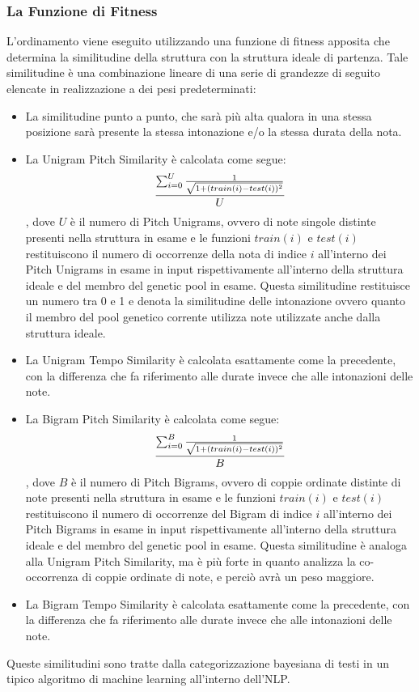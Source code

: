  \subsubsection{La Funzione di Fitness}
 L'ordinamento viene eseguito utilizzando una funzione di fitness apposita che determina la similitudine della struttura con la struttura ideale di partenza.
 Tale similitudine è una combinazione lineare di una serie di grandezze di seguito elencate in realizzazione a dei pesi predeterminati:
 \begin{itemize}
  \item La similitudine punto a punto, che sarà più alta qualora in una stessa posizione sarà presente la stessa intonazione e/o la stessa durata della nota.
  \item La Unigram Pitch Similarity è calcolata come segue:
  $${\sum_{i=0}^{U}{1 \over \sqrt{1 + (train(i)-test(i))^{2}}} \over U}$$, dove $U$ è il numero di Pitch Unigrams, ovvero di note singole distinte presenti nella struttura in esame e le funzioni $train(i)$ e $test(i)$ restituiscono il numero di occorrenze della nota di indice $i$ all'interno dei Pitch Unigrams in esame in input rispettivamente all'interno della struttura ideale e del membro del genetic pool in esame.
  Questa similitudine restituisce un numero tra 0 e 1 e denota la similitudine delle intonazione ovvero quanto il membro del pool genetico corrente utilizza note utilizzate anche dalla struttura ideale.
  \item La Unigram Tempo Similarity è calcolata esattamente come la precedente, con la differenza che fa riferimento alle durate invece che alle intonazioni delle note.
  \item La Bigram Pitch Similarity è calcolata come segue:
   $${\sum_{i=0}^{B}{1 \over \sqrt{1 + (train(i)-test(i))^{2}}} \over B}$$, dove $B$ è il numero di Pitch Bigrams, ovvero di coppie ordinate distinte di note presenti nella struttura in esame e le funzioni $train(i)$ e $test(i)$ restituiscono il numero di occorrenze del Bigram di indice $i$ all'interno dei Pitch Bigrams in esame in input rispettivamente all'interno della struttura ideale e del membro del genetic pool in esame.
   Questa similitudine è analoga alla Unigram Pitch Similarity, ma è più forte in quanto analizza la co-occorrenza di coppie ordinate di note, e perciò avrà un peso maggiore.
   \item La Bigram Tempo Similarity è calcolata esattamente come la precedente, con la differenza che fa riferimento alle durate invece che alle intonazioni delle note.
 \end{itemize}
Queste similitudini sono tratte dalla categorizzazione bayesiana di testi in un tipico algoritmo di machine learning all'interno dell'NLP.

